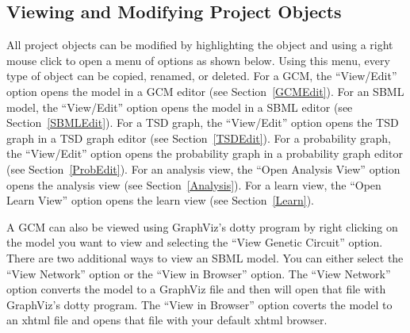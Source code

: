 \documentclass[titlepage,11pt]{article}
\begin{document}
\subsection{Viewing and Modifying Project Objects}

\noindent
All project objects can be modified by highlighting the object
and using a right mouse click to open a menu of options as shown
below. Using this menu, every type of object can be copied, renamed, or
deleted. For a GCM, the ``View/Edit'' option opens the
model in a GCM editor (see Section~\ref{GCMEdit}). For an SBML model,
the ``View/Edit'' option opens the model in a SBML editor 
(see Section~\ref{SBMLEdit}). For a TSD graph, the ``View/Edit'' 
option opens the TSD graph in a TSD graph editor (see Section~\ref{TSDEdit}). 
For a probability graph, the ``View/Edit'' option opens
the probability graph in a probability graph editor 
(see Section~\ref{ProbEdit}). 
For an analysis view, the ``Open Analysis View'' option opens the
analysis view (see Section~\ref{Analysis}). For a learn view, the
``Open Learn View'' option opens the learn view (see Section~\ref{Learn}).

A GCM can also be viewed using 
GraphViz's
dotty program  by right clicking on the model you want to view and
selecting the ``View Genetic Circuit'' option. 
There are two additional ways to view an SBML model. You
can either select the ``View Network'' option or the
``View in Browser'' option.  The ``View Network''
option converts the model to a GraphViz file and then will open that 
file with GraphViz's dotty program.  The ``View in Browser'' option 
coverts the model to an xhtml file and opens that file with your 
default xhtml browser.
\end{document}

